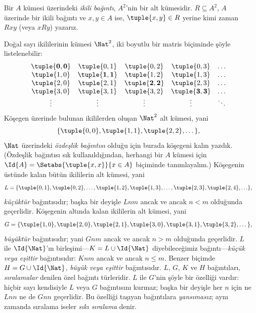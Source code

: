 \documentclass[../../../include/open-logic-section]{subfiles}
\begin{document}
\begin{defn}
Bir $A$ kümesi üzerindeki \emph{ikili bağıntı}, $A^{2}$'nin bir alt kümesidir.
$R \subseteq A^{2}$, $A$ üzerinde bir ikili bağıntı ve $x, y \in A$ ise,
$\tuple{x, y} \in R$ yerine kimi zaman $Rxy$ (veya $xRy$) yazarız.
\end{defn}

\begin{ex}
Doğal sayı ikililerinin kümesi $\Nat^{2}$, iki boyutlu bir matris biçiminde
şöyle listelenebilir:
\[
  \begin{array}{ccccc}
  \mathbf{\tuple{ 0,0 }} & \tuple{ 0,1 } &
    \tuple{ 0,2 } & \tuple{ 0,3 } & \ldots\\
  \tuple{ 1,0 } & \mathbf{\tuple{ 1,1 }} &
    \tuple{ 1,2 } & \tuple{ 1,3 } & \ldots\\
  \tuple{ 2,0 } & \tuple{ 2,1 } &
    \mathbf{\tuple{ 2,2 }} & \tuple{ 2,3 } & \ldots\\
  \tuple{ 3,0 } & \tuple{ 3,1 } & \tuple{ 3,2 } &
    \mathbf{\tuple{ 3,3 }} & \ldots\\
  \vdots & \vdots & \vdots & \vdots & \mathbf{\ddots}
  \end{array}
\]
Köşegen üzerinde bulunan ikililerden oluşan $\Nat^2$ alt kümesi, yani
\[
  \{\tuple{0,0 }, \tuple{ 1,1 }, \tuple{ 2,2 }, \dots\},
\]
$\Nat$ üzerindeki \emph{özdeşlik bağıntısı} olduğu için burada köşegeni kalın
yazdık. (Özdeşlik bağıntısı sık kullanıldığından, herhangi bir $A$ kümesi için
$\Id{A}=\Setabs{\tuple{ x,x }}{x \in A}$ biçiminde tanımlayalım.) Köşegenin
üstünde kalan bütün ikililerin alt kümesi, yani
\[
  L = \{\tuple{ 0,1 },\tuple{ 0,2 },\ldots,\tuple{ 1,2 },
  \tuple{ 1,3 }, \dots, \tuple{ 2,3 }, \tuple{ 2,4 },\ldots\},
\]
\emph{küçüktür} bağıntısıdır; başka bir deyişle $Lnm$ ancak ve ancak $n<m$
olduğunda geçerlidir. Köşegenin altında kalan ikililerin alt kümesi, yani
\[
  G=\{ \tuple{ 1,0 },\tuple{ 2,0 },\tuple{
    2,1 }, \tuple{ 3,0 },\tuple{ 3,1 },\tuple{ 3,2 }, \dots\},
\]
\emph{büyüktür} bağıntısıdır; yani $Gnm$ ancak ve ancak $n>m$ olduğunda
geçerlidir. $L$ ile $\Id{\Nat}$'ın birleşimi---$K=L\cup\Id{\Nat}$ diyebileceğimiz
bağıntı---\emph{küçük veya eşittir} bağıntısıdır: $Knm$ ancak ve ancak
$n \le m$. Benzer biçimde $H=G\cup\Id{\Nat}$, \emph{büyük veya eşittir}
bağıntısıdır. $L$, $G$, $K$ ve $H$ bağıntıları, \emph{sıralamalar} denilen özel
bağıntı türleridir. $L$ ile $G$'nin şöyle bir özelliği vardır: hiçbir sayı
kendisiyle $L$ veya $G$ bağıntısını kurmaz;
başka bir deyişle her $n$ için ne $Lnn$ ne de $Gnn$ geçerlidir. Bu özelliği
taşıyan bağıntılara \emph{yansımasız}; aynı zamanda sıralama iseler \emph{sıkı
sıralama} denir.
\end{ex}
\end{document}
